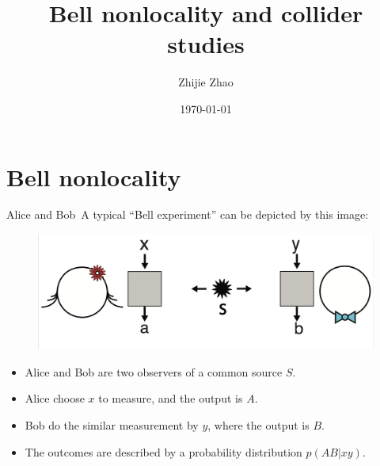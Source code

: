 \documentclass{beamer}
\title{Bell nonlocality and collider \\ studies}
\author{Zhijie Zhao}
\date{\today}
\begin{document}
    \maketitle

    \section{Bell nonlocality}

    \begin{frame}{Alice and Bob}{\thesection \, \secname}
        A typical ``Bell experiment'' can be depicted by this image:
        \begin{figure}[htbp]
            \centering
            \includegraphics[width=.75\linewidth]{img/alice-and-bob.png}
        \end{figure}
        \begin{center}
            \footnotesize {}
        \end{center}
        \begin{itemize}
            \item Alice and Bob are two observers of a common source $S$.
            \item Alice choose $x$ to measure, and the output is $A$.
            \item Bob do the similar measurement by $y$, where the output is $B$.
            \item The outcomes are described by a probability distribution $p(AB|xy)$.
        \end{itemize}
    \end{frame}
\end{document}

